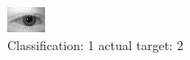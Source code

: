 \begin{figure}[h!]
\begin{center}
\includegraphics[width=0.60\columnwidth]{figures/ID406_class_1_target_2.png}
\end{center}
\caption{ Classification: 1 actual target: 2}
\label{fig:ID406_class_1_target_2}
\end{figure}
